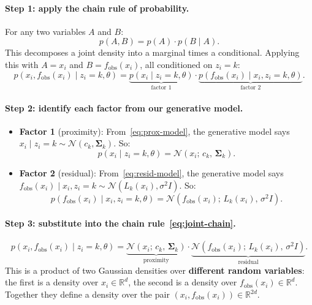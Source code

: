 \documentclass[11pt]{article}
\theoremstyle{definition}
\theoremstyle{plain}
\theoremstyle{remark}
\newcommand{\R}{\mathbb{R}}
\newcommand{\Sv}{\boldsymbol{\Sigma}}
\begin{document}
\paragraph{Step 1: apply the chain rule of probability.} For any two variables $A$ and $B$:
\begin{equation}
  p(A, B) = p(A) \cdot p(B \mid A).
  \label{eq:chain-rule-general}
\end{equation}
This decomposes a joint density into a marginal times a conditional. Applying this with $A=x_i$ and $B=f_{\mathrm{obs}}(x_i)$, all conditioned on $z_i=k$:
\begin{equation}
  p(x_i, f_{\mathrm{obs}}(x_i)\mid z_i=k,\theta) = \underbrace{p(x_i\mid z_i=k,\theta)}_{\text{factor 1}} \cdot \underbrace{p(f_{\mathrm{obs}}(x_i)\mid x_i, z_i=k,\theta)}_{\text{factor 2}}.
  \label{eq:joint-chain}
\end{equation}

\paragraph{Step 2: identify each factor from our generative model.}
\begin{itemize}[leftmargin=*,itemsep=2pt]
  \item \textbf{Factor 1} (proximity): From~\eqref{eq:prox-model}, the generative model says $x_i\mid z_i=k\sim\mathcal{N}(c_k,\Sv_k)$. So:
  \begin{equation}
    p(x_i\mid z_i=k,\theta) = \mathcal{N}(x_i;\,c_k,\,\Sv_k).
  \end{equation}
  \item \textbf{Factor 2} (residual): From~\eqref{eq:resid-model}, the generative model says $f_{\mathrm{obs}}(x_i)\mid x_i,z_i=k\sim\mathcal{N}(L_k(x_i),\sigma^2 I)$. So:
  \begin{equation}
    p(f_{\mathrm{obs}}(x_i)\mid x_i,z_i=k,\theta) = \mathcal{N}(f_{\mathrm{obs}}(x_i);\,L_k(x_i),\,\sigma^2 I).
  \end{equation}
\end{itemize}

\paragraph{Step 3: substitute into the chain rule~\eqref{eq:joint-chain}.}
\begin{equation}
  p(x_i, f_{\mathrm{obs}}(x_i)\mid z_i=k,\theta) = \underbrace{\mathcal{N}(x_i;\,c_k,\,\Sv_k)}_{\text{proximity}} \cdot \underbrace{\mathcal{N}(f_{\mathrm{obs}}(x_i);\,L_k(x_i),\,\sigma^2 I)}_{\text{residual}}.
  \label{eq:joint-lik}
\end{equation}
This is a product of two Gaussian densities over \textbf{different random variables}: the first is a density over $x_i\in\R^d$, the second is a density over $f_{\mathrm{obs}}(x_i)\in\R^d$. Together they define a density over the pair $(x_i,f_{\mathrm{obs}}(x_i))\in\R^{2d}$.
\end{document}
